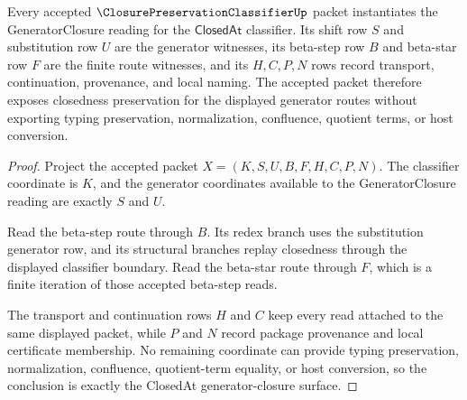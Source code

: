 \begin{theorem}
\label{thm:closure-preservation-classifier-generator-closure}
Every accepted $\ClosurePreservationClassifierUp$ packet instantiates the GeneratorClosure reading for the $\mathsf{ClosedAt}$ classifier. Its shift row $S$ and substitution row $U$ are the generator witnesses, its beta-step row $B$ and beta-star row $F$ are the finite route witnesses, and its $H,C,P,N$ rows record transport, continuation, provenance, and local naming. The accepted packet therefore exposes closedness preservation for the displayed generator routes without exporting typing preservation, normalization, confluence, quotient terms, or host conversion.
\end{theorem}
\begin{proof}
Project the accepted packet $X=(K,S,U,B,F,H,C,P,N)$. The classifier coordinate is $K$, and the generator coordinates available to the GeneratorClosure reading are exactly $S$ and $U$.

Read the beta-step route through $B$. Its redex branch uses the substitution generator row, and its structural branches replay closedness through the displayed classifier boundary. Read the beta-star route through $F$, which is a finite iteration of those accepted beta-step reads.

The transport and continuation rows $H$ and $C$ keep every read attached to the same displayed packet, while $P$ and $N$ record package provenance and local certificate membership. No remaining coordinate can provide typing preservation, normalization, confluence, quotient-term equality, or host conversion, so the conclusion is exactly the ClosedAt generator-closure surface.
\end{proof}


\begin{closurestatus}{\ClosurePreservationClassifierUp}
  \theoryclosure{\seedClosure}
  \formalstatus{\unformalizedV}
\end{closurestatus}
